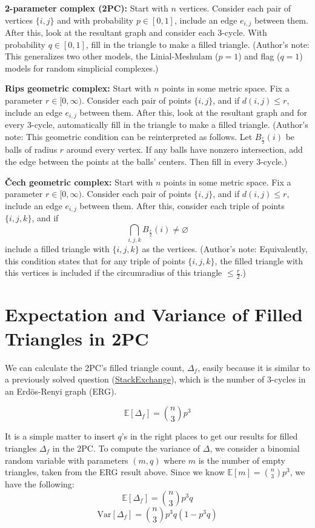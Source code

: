 \documentclass[11pt]{article}
\theoremstyle{definition}
\newcommand{\E}{\mathbb{E}}
\begin{document}
\textbf{2-parameter complex (2PC):} Start with $n$ vertices. Consider each pair of vertices $\{i,j\}$ and with probability $p \in [0,1]$, include an edge $e_{i,j}$ between them. After this, look at the resultant graph and consider each 3-cycle. With probability $q \in [0,1]$, fill in the triangle to make a filled triangle. (Author's note: This generalizes two other models, the Linial-Meshulam ($p=1$) and flag ($q=1$) models for random simplicial complexes.)

\textbf{Rips geometric complex:} Start with $n$ points in some metric space. Fix a parameter $r \in [0,\infty)$. Consider each pair of points $\{i,j\}$, and if $d(i,j) \leq r$, include an edge $e_{i,j}$ between them. After this, look at the resultant graph and for every 3-cycle, automatically fill in the triangle to make a filled triangle. (Author's note: This geometric condition can be reinterpreted as follows. Let $B_{\frac{r}{2}}(i)$ be balls of radius $r$ around every vertex. If any balls have nonzero intersection, add the edge between the points at the balls' centers. Then fill in every 3-cycle.)

\textbf{Čech geometric complex:} Start with $n$ points in some metric space. Fix a parameter $r \in [0,\infty)$. Consider each pair of points $\{i,j\}$, and if $d(i,j) \leq r$, include an edge $e_{i,j}$ between them. After this, consider each triple of points $\{i,j,k\}$, and if 
$$\bigcap\limits_{i,j,k} B_{\frac{r}{2}}(i) \neq \varnothing$$ 
include a filled triangle with $\{i,j,k\}$ as the vertices. (Author's note: Equivalently, this condition states that for any triple of points $\{i,j,k\}$, the filled triangle with this vertices is included if the circumradius of this triangle $\leq \frac{r}{2}$.)

\section{Expectation and Variance of Filled Triangles in 2PC}

We can calculate the 2PC's filled triangle count, $\Delta_f$, easily because it is similar to a previously solved question (\hyperlink{https://stats.stackexchange.com/questions/338267/distribution-and-variance-of-count-of-triangles-in-random-graph}{StackExchange}), which is the number of 3-cycles in an Erd\"{o}s-Renyi graph (ERG). 

$$
\mathbb{E}[\Delta_f] = {n \choose 3} p^3
$$

It is a simple matter to insert $q$'s in the right places to get our results for filled triangles $\Delta_f$ in the 2PC. To compute the variance of $\Delta$, we consider a binomial random variable with parameters $(m,q)$ where $m$ is the number of empty triangles, taken from the ERG result above. Since we know $\E[m] = {n \choose 3}p^3$, we have the following:
$$
\mathbb{E}[\Delta_f] = {n \choose 3}p^3q
$$
$$
\mathrm{Var}[\Delta_f] = {n \choose 3} p^3q(1-p^3q)
$$
\newpage
\end{document}
